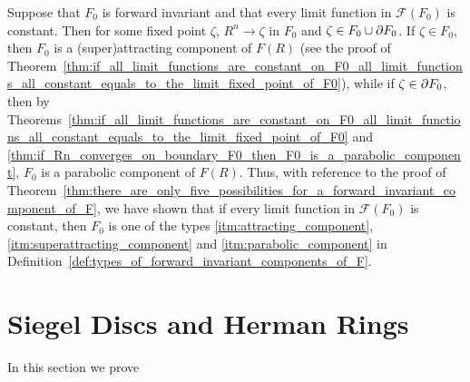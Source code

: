 \begin{remark}
    Suppose that $F_0$ is forward invariant and that every limit function in
    $\mathcal{F}(F_0)$ is constant. Then for some fixed point $\zeta$, $R^n \to
    \zeta$ in $F_0$ and $\zeta \in F_0 \cup \partial {F_0}$. If $\zeta \in F_0$,
    then $F_0$ is a (super)attracting component of $F(R)$ (see the proof of
    Theorem~\ref{thm:if_all_limit_functions_are_constant_on_F0_all_limit_functions_all_constant_equals_to_the_limit_fixed_point_of_F0}),
    while if $\zeta \in \partial {F_0}$, then by
    Theorems~\ref{thm:if_all_limit_functions_are_constant_on_F0_all_limit_functions_all_constant_equals_to_the_limit_fixed_point_of_F0}
    and
    \ref{thm:if_Rn_converges_on_boundary_F0_then_F0_is_a_parabolic_component},
    $F_0$ is a parabolic component of $F(R)$. Thus, with reference to the proof
    of
    Theorem~\ref{thm:there_are_only_five_possibilities_for_a_forward_invariant_component_of_F},
    we have shown that if every limit function in $\mathcal{F}(F_0)$ is constant,
    then $F_0$ is one of the types \ref{itm:attracting_component},
    \ref{itm:superattracting_component} and \ref{itm:parabolic_component} in
    Definition~\ref{def:types_of_forward_invariant_components_of_F}.
\end{remark}

\section{Siegel Discs and Herman Rings}
\label{sec:siegel_discs_and_herman_rings}

In this section we prove

